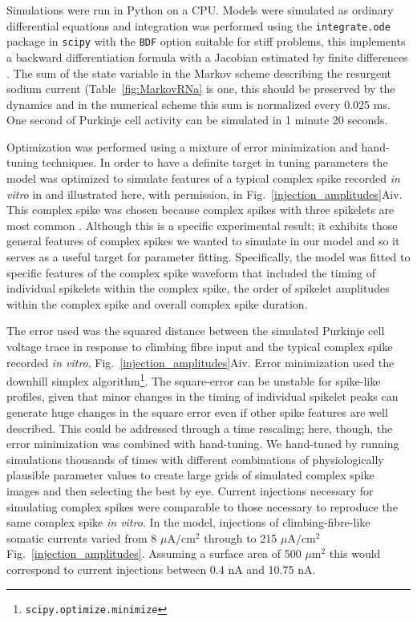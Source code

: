 \documentclass[twocolumn]{svjour3}          %
\begin{document}
Simulations were run in Python on a CPU. Models were simulated as
ordinary differential equations and integration was performed using
the \texttt{integrate.ode} package in \texttt{scipy} with the
\texttt{BDF} option suitable for stiff problems, this implements a
backward differentiation formula with a Jacobian estimated by finite
differences \citep{ByrneHindmarsh1975}. The sum of the state variable
in the Markov scheme describing the resurgent sodium current
(Table~\ref{fig:MarkovRNa} is one, this should be preserved by the
dynamics and in the numerical scheme this sum is normalized every
0.025 ms. One second of Purkinje cell activity can be simulated in 1
minute 20 seconds.

Optimization was performed using a mixture of error minimization and
hand-tuning techniques. In order to have a definite
target in tuning parameters the model was optimized to simulate
features of a typical complex spike recorded \textit{in vitro} in
\citet{DavieEtAl2008} and illustrated here, with permission, in
Fig.~\ref{injection_amplitudes}Aiv. This complex spike was chosen
because complex spikes with three spikelets are most common
\citep{BurroughsEtAl2016}. Although this is a specific experimental
result; it exhibits those general features of complex spikes we wanted
to simulate in our model and so it serves as a useful target for
parameter fitting. Specifically, the model was fitted to specific
features of the complex spike waveform that included the timing of
individual spikelets within the complex spike, the order of spikelet
amplitudes within the complex spike and overall complex spike
duration.

The error used was the squared distance between the simulated Purkinje
cell voltage trace in response to climbing fibre input and the typical
complex spike recorded \textit{in vitro},
Fig.~\ref{injection_amplitudes}Aiv. Error minimization used the
downhill simplex
algorithm\footnote{\texttt{scipy.optimize.minimize}}. The square-error
can be unstable for spike-like profiles, given that minor changes in
the timing of individual spikelet peaks can generate huge changes in
the square error even if other spike features are well described. This
could be addressed through a time rescaling; here, though, the error
minimization was combined with hand-tuning. We hand-tuned by running
simulations thousands of times with different combinations of
physiologically plausible parameter values to create large grids of
simulated complex spike images and then selecting the best by
eye. Current injections necessary for simulating complex spikes were
comparable to those necessary to reproduce the same complex spike
\textit{in vitro}. In the model, injections of climbing-fibre-like
somatic currents varied from 8 $\mu$A$/$cm$^2$ through to 215
$\mu$A$/$cm$^2$ Fig.~\ref{injection_amplitudes}. Assuming a surface
area of 500 $\mu$m$^2$ this would correspond to current injections
between 0.4 nA and 10.75 nA.
\end{document}
